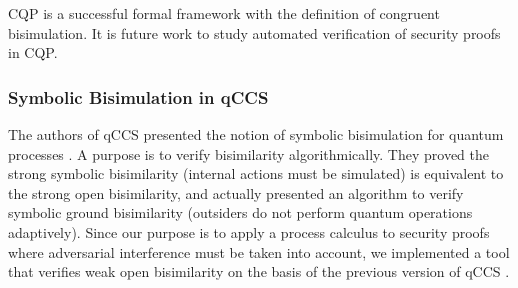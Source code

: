 CQP is a successful formal framework with
the definition of congruent bisimulation.
It is future work to study automated verification of
security proofs in CQP.

\subsubsection{Symbolic Bisimulation in qCCS}
The authors of qCCS presented the notion of symbolic
bisimulation for quantum processes \cite{FengDengYing2012}.
A purpose is to
verify bisimilarity algorithmically. They proved the
strong symbolic bisimilarity (internal actions must be simulated) is
equivalent to the strong open
bisimilarity, and actually presented an algorithm to verify symbolic ground
bisimilarity (outsiders do not perform quantum operations adaptively).
 Since our purpose is to apply a process calculus to security proofs
 where adversarial interference must be taken into account, we 
implemented a tool that verifies weak open bisimilarity
on the basis of the previous version of qCCS \cite{DengFeng2012}.

